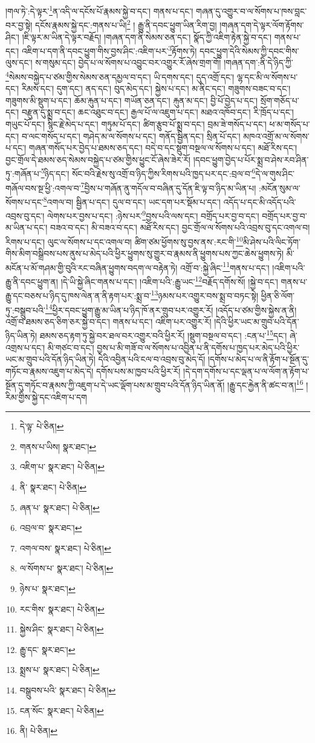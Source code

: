 །གལ་ཏེ་:དེ་ལྟར་\footnote{དེ་ལྟ་  པེ་ཅིན། }ན་འདི་ལ་དངོས་པོ་རྣམས་སྐྱེ་བ་དང་། གནས་པ་དང་། གཞན་དུ་འགྱུར་བ་ལ་སོགས་པ་ཁས་བླང་བར་བྱ་སྟེ། དངོས་རྣམས་སྐྱེ་དང་:གནས་པ་ཡི།\footnote{གནས་པ་ཡིས།  སྣར་ཐང་། } །
རྒྱུ་ནི་དབང་ཕྱུག་ཡིན་རིག་བྱ། །གཞན་དག་དེ་ལྟར་ལོག་རྟོགས་ཤིང་། །ཇི་ལྟར་མ་ཡིན་དེ་ལྟར་བརྗོད། །གཞན་དག་ནི་སེམས་ཅན་དང་། སྣོད་ཀྱི་འཇིག་རྟེན་སྐྱེ་བ་དང་། གནས་པ་དང་། འཇིག་པ་དག་ནི་དབང་ཕྱུག་གིས་བྱས་ཤིང་:འཇིག་པར་\footnote{འཇིག་པ་  སྣར་ཐང་།  པེ་ཅིན། }རྟོགས་ཏེ། དབང་ཕྱུག་དེའི་སེམས་ཀྱི་དབང་གིས་ལུས་དང་། ས་གསུམ་དང་། བྱེད་པ་ལ་སོགས་པ་འབྱུང་བར་འགྱུར་རོ་ཞེས་གྲག་གོ། །གཞན་དག་:ནི་དེ་ཉིད་ཀྱི་\footnote{ནི་  སྣར་ཐང་།  པེ་ཅིན། }སེམས་བསྐྱེད་པ་ཙམ་གྱིས་སེམས་ཅན་དམྱལ་བ་དང་། ཡི་དགས་དང་། དུད་འགྲོ་དང་། ལྷ་དང་མི་ལ་སོགས་པ་དང་། རིམས་དང་། དུག་དང་། ནད་དང་། བུད་མེད་དང་། སྐྱེས་པ་དང་། མ་ནིང་དང་། གཟུགས་བཟང་བ་དང་། གཟུགས་མི་སྡུག་པ་དང་། ཆོམ་རྐུན་པ་དང་། གཡོན་ཅན་དང་། རྐུན་མ་དང་། བྱི་པོ་བྱེད་པ་དང་། སྲོག་གཅོད་པ་དང་། བརྫུན་དུ་སྨྲ་བ་དང་། ཆང་འཐུང་བ་དང་། རྒྱལ་པོ་ལ་འཇུག་པ་དང་། མཐའ་འཁོབ་དང་། རི་ཁྲོད་པ་དང་། གཡུང་པོ་དང་། སྙིང་རྗེ་མེད་པ་དང་། གཏུམ་པོ་དང་། ཚིག་རྩུབ་པོ་སྨྲ་བ་དང་། བྲམ་ཟེ་གསོད་པ་དང་། ཕ་མ་གསོད་པ་དང་། བ་ལང་གསོད་པ་དང་། གཤེད་མ་ལ་སོགས་པ་དང་། གནོད་སྦྱིན་དང་། སྲིན་པོ་དང་། མཁའ་འགྲོ་མ་ལ་སོགས་པ་དང་། གཞན་གསོད་པར་བྱེད་པ་ཐམས་ཅད་དང་། བདེ་བ་དང་སྡུག་བསྔལ་ལ་སོགས་པ་དང་། མཐོ་རིས་དང་། བྱང་གྲོལ་དེ་ཐམས་ཅད་སེམས་བསྐྱེད་པ་ཙམ་གྱིས་ཕྱུང་ངོ་ཞེས་ཟེར་རོ། །དབང་ཕྱུག་བྱེད་པ་པོར་སྨྲ་བ་ཤེས་རབ་ཤིན་ཏུ་:གཞོན་པ་\footnote{ཞན་པ་  སྣར་ཐང་།  པེ་ཅིན། }ཉིད་དང་། སོང་བའི་རྗེས་སུ་འགྲོ་བ་ཉིད་ཀྱིས་རིགས་པའི་ཁྱད་པར་དང་:བྲལ་བ་\footnote{འབྲལ་བ་  སྣར་ཐང་། }དེ་ལ་གུས་ཤིང་གཞོལ་བས་སྔ་ཕྱི་:འགལ་བ་\footnote{འགལ་བས་  སྣར་ཐང་།  པེ་ཅིན། }བྱིས་པ་གཞོན་ནུ་གདོལ་བ་བཞིན་དུ་དོན་ཇི་ལྟ་བ་ཉིད་མ་ཡིན་པ། :མངོན་སུམ་ལ་སོགས་པ་དང་\footnote{ལ་སོགས་པ་  སྣར་ཐང་།  པེ་ཅིན། }འགལ་བ། སྦྱིན་པ་དང་། དུལ་བ་དང་། ཡང་དག་པར་སྡོམ་པ་དང་། འདོད་པ་དང་མི་འདོད་པའི་འབྲས་བུ་དང་། ལེགས་པར་བྱས་པ་དང་། :ཉེས་པར་\footnote{ཉེས་པ་  སྣར་ཐང་། }བྱས་པའི་ལས་དང་། བགྲོད་པར་བྱ་བ་དང་། བགྲོད་པར་བྱ་བ་མ་ཡིན་པ་དང་། བཟའ་བ་དང་། མི་བཟའ་བ་དང་། མཐོ་རིས་དང་། བྱང་གྲོལ་ལ་སོགས་པའི་འབྲས་བུ་དང་འགལ་བ། རིགས་པ་དང་། ལུང་ལ་སོགས་པ་དང་འགལ་བ། ཚིག་ཙམ་ཕྱོགས་སུ་བྱས་ནས་:རང་གི་\footnote{རང་གིས་  སྣར་ཐང་།  པེ་ཅིན། }མི་ཤེས་པའི་ལིང་ཏོག་གིས་མིག་བསྒྲིབས་པས་ནུས་པ་མེད་པའི་ཕྱིར་ཕྱུགས་སུ་གྱུར་བ་རྣམས་ནི་ཕྱུགས་པས་ཀྱང་ཆེས་ཕྱུགས་ཏེ། མི་མངོན་པ་མོ་གཤམ་གྱི་བུའི་རང་བཞིན་ཕྱུགས་བདག་ལ་བརྟེན་ཏེ། འགྲོ་བ་:སྐྱེ་ཞིང་\footnote{སྐྱེས་ཤིང་  སྣར་ཐང་།  པེ་ཅིན། }གནས་པ་དང་། །འཇིག་པའི་རྒྱུ་ནི་དབང་ཕྱུག་ན། །དེ་ཡི་སྐྱེ་ཞིང་གནས་པ་དང་། །འཇིག་པའི་:རྒྱུ་ཡང་\footnote{རྒྱུ་དང་  སྣར་ཐང་། }བརྗོད་དགོས་སོ། །སྐྱེ་བ་དང་། གནས་པ་རྒྱུ་དང་བཅས་པ་ཉིད་དུ་ཁས་ལེན་ན་ནི་རྟག་པར་:སྨྲ་བ་\footnote{སྨྲས་པ་  སྣར་ཐང་།  པེ་ཅིན། }ཉམས་པར་འགྱུར་བས་སྨྲ་བ་བཏང་སྟེ། ཕྱིན་ཅི་ལོག་ཏུ་:བསྒྲུབ་པའི་\footnote{བསྒྲུབས་པའི་  སྣར་ཐང་།  པེ་ཅིན། }ཕྱིར་དབང་ཕྱུག་རྒྱུ་མ་ཡིན་པ་ཉིད་ཁོ་ནར་གྲུབ་པར་འགྱུར་རོ། །འདོད་པ་ཙམ་གྱིས་སྐྱེས་ན་ནི། འགྲོ་བ་ཐམས་ཅད་ཅིག་ཅར་སྐྱེ་བ་དང་། གནས་པ་དང་། འཇིག་པར་འགྱུར་རོ། །དེའི་ཕྱིར་ཡང་མ་གྲུབ་པའི་དོན་ཉིད་ཡིན་ཏེ། ཐམས་ཅད་རྟག་ཏུ་སྐྱེ་བར་ཐལ་བར་འགྱུར་བའི་ཕྱིར་རོ། །སྡུག་བསྔལ་བ་དང་། :ངན་པ་\footnote{ངན་སོང་  སྣར་ཐང་།  པེ་ཅིན། }དང་། ཞེ་འགྲས་པ་དང་། མི་གཙང་བ་དང་། བྱས་པ་མི་གཟོ་བ་ལ་སོགས་པ་འབྱིན་པ་ནི་དགོས་པ་ཁྱད་པར་མེད་པའི་ཕྱིར་ཡང་མ་གྲུབ་པའི་དོན་ཉིད་ཡིན་ཏེ། དེའི་འབྱིན་པའི་ངལ་བ་འབྲས་བུ་མེད་དོ། །དགོས་པ་མེད་པ་ལ་ནི་རྟོག་པ་སྔོན་དུ་གཏོང་བ་རྣམས་འཇུག་པ་མེད་དེ། དགོས་པས་མ་ཁྱབ་པའི་ཕྱིར་རོ། །དེ་དག་དགོས་པ་དང་ལྡན་པ་ལ་ལོག་ན་རྟོག་པ་སྔོན་དུ་གཏོང་བ་རྣམས་ཀྱི་འཇུག་པ་དེ་ཡང་ལྡོག་པས་མ་གྲུབ་པའི་དོན་ཉིད་ཡིན་ནོ། །རྒྱུ་དང་རྐྱེན་ནི་ཚང་བ་ན།\footnote{ནི།  པེ་ཅིན། } །རིམ་གྱིས་སྐྱེ་དང་འཇིག་པ་དག 